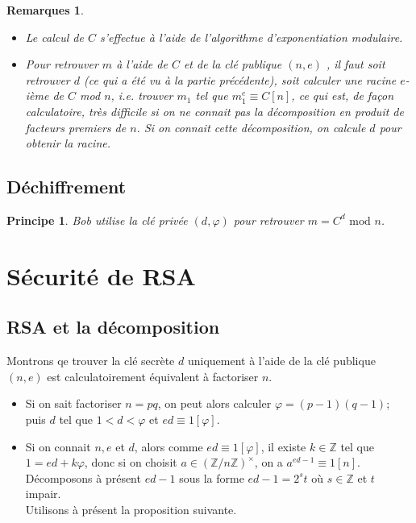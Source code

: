 \documentclass[12pt]{report}
\newtheorem*{rems}{Remarques}
\newtheorem*{prin}{Principe}
\begin{document}
\begin{rems}\
\begin{itemize}
\item[•] Le calcul de $C$ s'effectue à l'aide de l'algorithme d'exponentiation modulaire.
\item[•] Pour retrouver $m$ à l'aide de $C$ et de la clé publique $(n,e)$ , il faut soit retrouver $d$ (ce qui a été vu à la partie précédente), soit calculer une racine $e$-ième de $C$ mod $n$, i.e. trouver $m_1$ tel que $m_1^e \equiv C [n]$, ce qui est, de façon calculatoire, très difficile si on ne connait pas la décomposition en produit de facteurs premiers de $n$. Si on connait cette décomposition, on calcule $d$ pour obtenir la racine. 
\end{itemize}
\end{rems}

\subsection{Déchiffrement}

\begin{prin}
Bob utilise la clé privée $(d,\varphi)$ pour retrouver $m=C^d \text{ mod } n$.
\end{prin}

\section{Sécurité de RSA}

\subsection{RSA et la décomposition}

Montrons qe trouver la clé secrète $d$ uniquement à l'aide de la clé publique $(n,e)$ est calculatoirement équivalent à factoriser $n$.

\begin{itemize}
\item[•] Si on sait factoriser $n=pq$, on peut alors calculer $\varphi=(p-1)(q-1)$; puis $d$ tel que $1<d<\varphi$ et $ed \equiv 1 [\varphi]$.
\item[•] Si on connait $n,e$ et $d$, alors comme $ed \equiv 1 [\varphi]$, il existe $k \in \mathbb{Z}$ tel que $1=ed + k \varphi$, donc si on choisit $a \in (\mathbb{Z}/n\mathbb{Z})^{\times}  $, on a $a^{ed-1}\equiv 1 [n]$. Décomposons à présent $ed-1$ sous la forme $ed-1=2^s t$ où $s \in \mathbb{Z}$ et $t$ impair.\\
Utilisons à présent la proposition suivante. 
\end{itemize}
\end{document}
